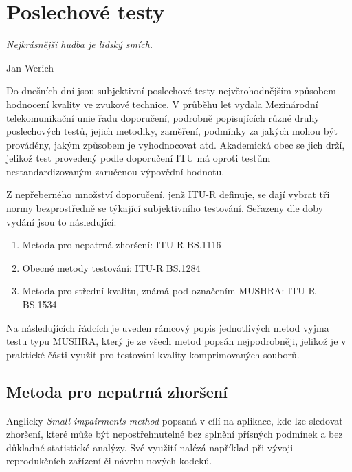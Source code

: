 \chapter{Poslechové testy}
\label{chap.listeningTests}

\epigraph{\hfill\textit{Nejkrásnější hudba je lidský smích.}}{Jan Werich}


Do dnešních dní jsou subjektivní poslechové testy nejvěrohodnějším způsobem hodnocení kvality ve zvukové technice. V průběhu let vydala Mezinárodní telekomunikační unie řadu doporučení, podrobně popisujících různé druhy poslechových testů, jejich metodiky, zaměření, podmínky za jakých mohou být prováděny, jakým způsobem je vyhodnocovat atd. Akademická obec se jich drží, jelikož test provedený podle doporučení ITU má oproti testům nestandardizovaným zaručenou výpovědní hodnotu.


Z nepřeberného množství doporučení, jenž ITU-R definuje, se dají vybrat tři normy bezprostředně se týkající subjektivního testování. Seřazeny dle doby vydání jsou to následující:

\begin{enumerate}
    \item Metoda pro nepatrná zhoršení:  ITU-R BS.1116 \cite{itur:1116}
    \item Obecné metody testování: ITU-R BS.1284 \cite{itur:1284}
    \item Metoda pro střední kvalitu, známá pod označením MUSHRA: ITU-R BS.1534 \cite{itur:1534}
\end{enumerate}

Na následujících řádcích je uveden rámcový popis jednotlivých metod vyjma testu typu MUSHRA, který je ze všech metod popsán nejpodrobněji, jelikož je v praktické části využit pro testování kvality komprimovaných souborů.


\section{Metoda pro nepatrná zhoršení}

\label{subchapter:impairment}

Anglicky \textit{Small impairments method} popsaná v \cite{itur:1116} cílí na aplikace, kde lze sledovat zhoršení, které může být nepostřehnutelné bez splnění přísných podmínek a bez důkladné statistické analýzy. Své využití nalézá například při vývoji reprodukčních zařízení či návrhu nových kodeků.


